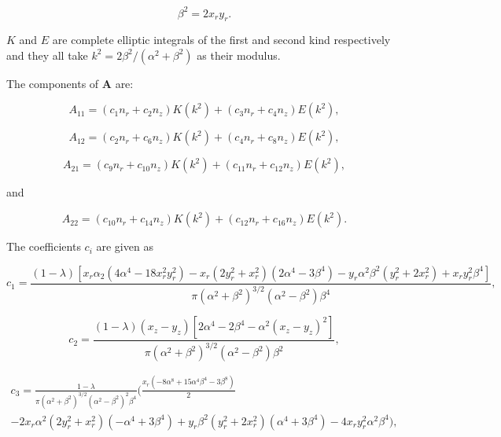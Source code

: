 \documentclass[12pt]{article}
\begin{document}
\begin{equation}
\label{equ:beta_def}
\beta^{2} = 2 x_{r} y_{r}.
\end{equation}


$K$ and $E$ are complete elliptic integrals of the first and second kind respectively and they all take $k^{2} = 2 \beta^{2} / (\alpha^{2} + \beta^{2})$ as their modulus. 

The components of $\boldsymbol{A}$ are:

\begin{equation}
\label{equ:A11_comp}
A_{11} = (c_{1} n_{r} + c_{2} n_{z})K(k^{2}) + (c_{3} n_{r} + c_{4} n_{z})E(k^{2}),
\end{equation}

\begin{equation}
\label{equ:A12_comp}
A_{12} = (c_{2} n_{r} + c_{6} n_{z})K(k^{2}) + (c_{4} n_{r} + c_{8} n_{z})E(k^{2}),
\end{equation}

\begin{equation}
\label{equ:A21_comp}
A_{21} = (c_{9} n_{r} + c_{10} n_{z})K(k^{2}) + (c_{11} n_{r} + c_{12} n_{z})E(k^{2}),
\end{equation}

and 

\begin{equation}
\label{equ:A22_comp}
A_{22} = (c_{10} n_{r} + c_{14} n_{z})K(k^{2}) + (c_{12} n_{r} + c_{16} n_{z})E(k^{2}).
\end{equation}

The coefficients $c_{i}$ are given as

\begin{equation}
\label{equ:coeff_a1}
c_{1} = \frac{(1 - \lambda) [x_{r} \alpha_{2} (4 \alpha^{4} - 18 x_{r}^{2} y_{r}^{2}) - x_{r} (2 y_{r}^{2} + x_{r}^{2}) (2 \alpha^{4} - 3 \beta^{4}) - y_{r} \alpha^{2} \beta^{2} (y_{r}^{2} + 2 x_{r}^{2}) + x_{r} y_{r}^{2} \beta^{4}]}{\pi (\alpha^{2} + \beta^{2})^{3/2} (\alpha^{2} - \beta^{2}) \beta^{4}},
\end{equation}

\begin{equation}
\label{equ:equ:coeff_a2}
c_{2} = \frac{(1 - \lambda) (x_{z} - y_{z}) [2 \alpha^{4} - 2 \beta^{4} - \alpha^{2} (x_{z} - y_{z})^{2}]}{\pi (\alpha^{2} + \beta^{2})^{3/2} (\alpha^{2} - \beta^{2}) \beta^{2}},
\end{equation}

\begin{align}
\label{equ:coeff_a3}
c_{3} = \frac{1 - \lambda}{\pi (\alpha^{2} + \beta^{2})^{3/2} (\alpha^{2} - \beta^{2})^{2} \beta^{4}} \bigg( \frac{x_{r} (-8 \alpha^{8} + 15 \alpha^{4} \beta^{4} - 3 \beta^{8})}{2} \nonumber \\
- 2 x_{r} \alpha^{2} (2 y_{r}^{2} + x_{r}^{2}) (-\alpha^{4} + 3 \beta^{4}) + y_{r} \beta^{2} (y_{r}^{2} + 2 x_{r}^{2}) (\alpha^{4} + 3 \beta^{4}) - 4 x_{r} y_{r}^{2} \alpha^{2} \beta^{4} \bigg),
\end{align}
\end{document}
